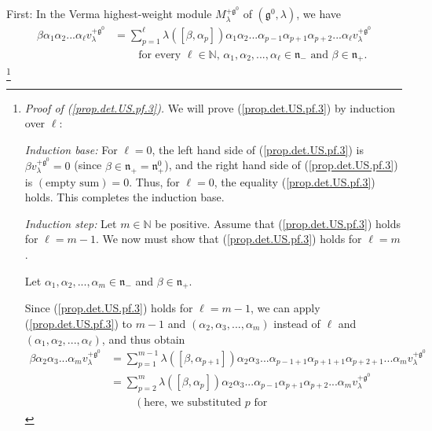 \documentclass
[numbers=enddot,12pt,final,onecolumn,german,notitlepage]{scrartcl}%
\theoremstyle{definition}
\begin{document}
First: In the Verma highest-weight module $M_{\lambda}^{+\mathfrak{g}^{0}}$ of
$\left(  \mathfrak{g}^{0},\lambda\right)  $, we have%
\begin{align}
\beta\alpha_{1}\alpha_{2}...\alpha_{\ell}v_{\lambda}^{+\mathfrak{g}^{0}}  &
=\sum\limits_{p=1}^{\ell}\lambda\left(  \left[  \beta,\alpha_{p}\right]
\right)  \alpha_{1}\alpha_{2}...\alpha_{p-1}\alpha_{p+1}\alpha_{p+2}%
...\alpha_{\ell}v_{\lambda}^{+\mathfrak{g}^{0}}\label{prop.det.US.pf.3}\\
&  \ \ \ \ \ \ \ \ \ \ \text{for every }\ell\in\mathbb{N}\text{, }\alpha
_{1},\alpha_{2},...,\alpha_{\ell}\in\mathfrak{n}_{-}\text{ and }\beta
\in\mathfrak{n}_{+}\text{.}\nonumber
\end{align}
\footnote{\textit{Proof of (\ref{prop.det.US.pf.3}).} We will prove
(\ref{prop.det.US.pf.3}) by induction over $\ell$:
\par
\textit{Induction base:} For $\ell=0$, the left hand side of
(\ref{prop.det.US.pf.3}) is $\beta v_{\lambda}^{+\mathfrak{g}^{0}}=0$ (since
$\beta\in\mathfrak{n}_{+}=\mathfrak{n}_{+}^{0}$), and the right hand side of
(\ref{prop.det.US.pf.3}) is $\left(  \text{empty sum}\right)  =0$. Thus, for
$\ell=0$, the equality (\ref{prop.det.US.pf.3}) holds. This completes the
induction base.
\par
\textit{Induction step:} Let $m\in\mathbb{N}$ be positive. Assume that
(\ref{prop.det.US.pf.3}) holds for $\ell=m-1$. We now must show that
(\ref{prop.det.US.pf.3}) holds for $\ell=m$.
\par
Let $\alpha_{1},\alpha_{2},...,\alpha_{m}\in\mathfrak{n}_{-}$ and $\beta
\in\mathfrak{n}_{+}$.
\par
Since (\ref{prop.det.US.pf.3}) holds for $\ell=m-1$, we can apply
(\ref{prop.det.US.pf.3}) to $m-1$ and $\left(  \alpha_{2},\alpha
_{3},...,\alpha_{m}\right)  $ instead of $\ell$ and $\left(  \alpha_{1}%
,\alpha_{2},...,\alpha_{\ell}\right)  $, and thus obtain%
\begin{align*}
\beta\alpha_{2}\alpha_{3}...\alpha_{m}v_{\lambda}^{+\mathfrak{g}^{0}}  &
=\sum\limits_{p=1}^{m-1}\lambda\left(  \left[  \beta,\alpha_{p+1}\right]
\right)  \alpha_{2}\alpha_{3}...\alpha_{p-1+1}\alpha_{p+1+1}\alpha
_{p+2+1}...\alpha_{m}v_{\lambda}^{+\mathfrak{g}^{0}}\\
&  =\sum\limits_{p=2}^{m}\lambda\left(  \left[  \beta,\alpha_{p}\right]
\right)  \alpha_{2}\alpha_{3}...\alpha_{p-1}\alpha_{p+1}\alpha_{p+2}%
...\alpha_{m}v_{\lambda}^{+\mathfrak{g}^{0}}\\
&  \ \ \ \ \ \ \ \ \ \ \left(  \text{here, we substituted }p\text{ for
}
\end{align*}}
\end{document}
